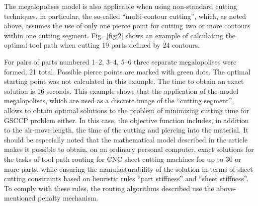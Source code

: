 \documentclass[numbers,sort&compress]{IntechOpen-Book}%
\begin{document}
The megalopolises model is also applicable
when using non-standard cutting techniques,
in particular, the so-called ``multi-contour cutting'',
which, as noted above, assumes the use of only
one pierce point
for cutting two or more contours within one cutting segment.
Fig.~\ref{fig:2}
shows an example of calculating the optimal tool path
when cutting 19 parts defined by 24 contours.

\begin{figure}
  \centering
\end{figure}

For pairs of parts numbered 1--2, 3--4, 5--6
three separate megalopolises were formed,
21 total.
Possible pierce points are marked with green dots.
The optimal starting point was not calculated in this example.
The time to obtain an exact solution is 16 seconds.
This example shows that the application of the model megalopolises,
which are used as a discrete image of the ``cutting segment'',
allows to obtain optimal solutions to the problem of
minimizing cutting time for GSCCP problem either.
In this case,
the objective function includes,
in addition to the air-move length,
the time of the cutting and piercing into the material.
It should be especially noted
that the mathematical model described in the article
makes it possible to obtain,
on an ordinary personal computer,
exact solutions for the tasks of tool path routing for CNC sheet cutting machines
for up to 30 or more parts,
while ensuring the manufacturability of the solution in terms of sheet cutting constraints based on heuristic rules
``part stiffness'' and
``sheet stiffness''.
To comply with these rules,
the routing algorithms described
use the above-mentioned penalty mechanism.
\end{document}
